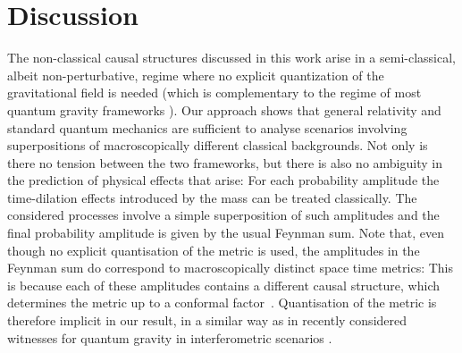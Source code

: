 \documentclass[a4paper,11pt]{article}
\newcommand{\red}[1]{\textcolor{red}{#1}}
\begin{document}
\section*{Discussion}\label{sec:discussion}
The non-classical causal structures discussed in this work arise in a semi-classical, albeit non-perturbative, regime where no {explicit} quantization of the gravitational field is needed (which is complementary to the regime of most quantum gravity frameworks \cite{kiefer2012quantum}).
Our approach shows that general relativity and standard quantum mechanics are sufficient to analyse scenarios involving superpositions of macroscopically different {classical} backgrounds. Not only  is there no tension between the two frameworks, but there is also {no ambiguity} in the prediction of physical effects that arise: For each probability amplitude the time-dilation effects introduced by the mass can be treated classically. The considered processes involve a simple superposition of such amplitudes and the final probability amplitude is given by the usual Feynman sum. Note that, even though no explicit quantisation of the metric is used, the amplitudes in the Feynman sum do correspond to macroscopically distinct space time metrics: This is because each of these amplitudes contains a different causal structure, which determines the metric up to a conformal factor~\cite{Hawking1976, Malament1977}. {Quantisation of the metric is therefore implicit in our result, in a similar way as in recently considered witnesses for quantum gravity in interferometric scenarios \cite{bose2017spin, marletto2017entanglement, belenchia2018quantum}.}

\end{document}

